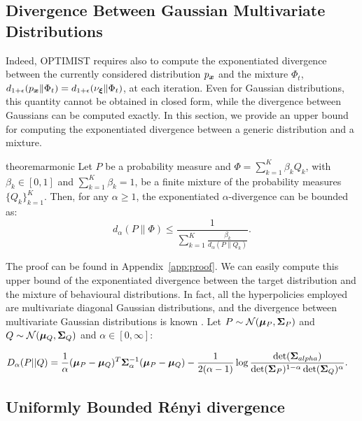 \subsection{Divergence Between Gaussian Multivariate Distributions}

Indeed, \gls{OPTIMIST} requires also to compute the exponentiated \Renyi divergence between the currently considered distribution $p_{\boldsymbol{x}}$ 
and the mixture $\Phi_t$, \ie $d_{1+\epsilon}(p_{\boldsymbol{x}}\|\Phi_t)=d_{1+\epsilon}(\nu_{\boldsymbol{\xi}}\|\Phi_t)$, at each iteration. Even for Gaussian distributions, this quantity cannot be obtained in closed form, while
the \Renyi divergence between Gaussians can be computed exactly. In this section, we provide an upper bound for computing the exponentiated \Renyi divergence
between a generic distribution and a mixture.
\begin{restatable}{theorem}{armonic}\label{th:armonic}
	Let $P$ be a probability measure and $\Phi = \sum_{k=1}^K \beta_k Q_k$, with $\beta_k \in [0,1]$ and $\sum_{k=1}^K \beta_k =1$, be a finite mixture of the
	probability measures $\{Q_k\}_{k=1}^K$. Then, for any $\alpha \ge 1$, the exponentiated $\alpha$-\Renyi divergence can be bounded as: 
	\begin{equation}
	d_{\alpha}(P \| \Phi) \le \frac{1} {\sum_{k=1}^K \frac{ \beta_k}{ d_{\alpha}(P \| Q_k)}}.
	\end{equation}
\end{restatable}

The proof can be found in Appendix~\ref{app:proof}. We can easily compute this upper bound of the exponentiated \Renyi divergence between the target distribution and the mixture of behavioural distributions. In fact, all the hyperpolicies employed are multivariate diagonal Gaussian distributions, and the \Renyi divergence between multivariate Gaussian distributions is known \cite{gil2013renyi}. Let $P\sim\mathcal{N}(\boldsymbol{\mu}_P,\boldsymbol{\Sigma}_P)$ and $Q\sim\mathcal{N}(\boldsymbol{\mu}_Q,\boldsymbol{\Sigma}_Q)$ and $\alpha\in[0,\infty]$:

\begin{align} \label{eq:gaussianrenyi}
D_{\alpha}(P||Q) &= \frac{1}{\alpha}(\boldsymbol{\mu}_P-\boldsymbol{\mu}_Q)^T\boldsymbol{\Sigma}_\alpha^{-1}(\boldsymbol{\mu}_P-\boldsymbol{\mu}_Q)-\frac{1}{2(\alpha-1)}\log\frac{\det(\boldsymbol{\Sigma}_{alpha})}{\det(\boldsymbol{\Sigma}_P)^{1-\alpha}\det(\boldsymbol{\Sigma}_Q)^{\alpha}}.
\end{align}
 

\subsection{Uniformly Bounded Rényi divergence} \label{subsec:boundrenyi}

